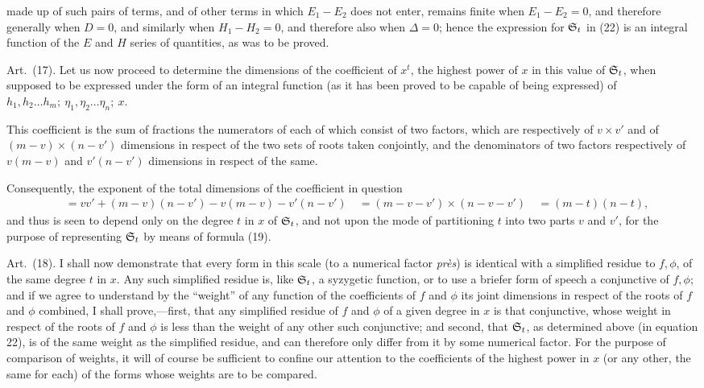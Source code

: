 \documentclass[11pt]{article}
\newcommand{\sourcepage}[1]{\marginpar{\scriptsize p.~#1}}
\newcommand{\art}[1]{\par\smallskip\noindent Art.~(#1).\quad}
\begin{document}
\sourcepage{463}
made up of such pairs of terms, and of other terms in which $E_1-E_2$ does not enter, remains finite when $E_1-E_2=0$, and therefore generally when $D=0$, and similarly when $H_1-H_2=0$, and therefore also when $\Delta=0$; hence the expression for $\mathfrak{S}_t$ in (22) is an integral function of the $E$ and $H$ series of quantities, as was to be proved.

\art{17} Let us now proceed to determine the dimensions of the coefficient of $x^t$, the highest power of $x$ in this value of $\mathfrak{S}_t$, when supposed to be expressed under the form of an integral function (as it has been proved to be capable of being expressed) of $h_1,h_2\ldots h_m;\ \eta_1,\eta_2\ldots\eta_n;\ x$.

This coefficient is the sum of fractions the numerators of each of which consist of two factors, which are respectively of $v\times v'$ and of $(m-v)\times(n-v')$ dimensions in respect of the two sets of roots taken conjointly, and the denominators of two factors respectively of $v(m-v)$ and $v'(n-v')$ dimensions in respect of the same.

Consequently, the exponent of the total dimensions of the coefficient in question
\[
\begin{aligned}
&=vv'+(m-v)(n-v')-v(m-v)-v'(n-v')\
&=(m-v-v')\times(n-v-v')\
&=(m-t)(n-t),
\end{aligned}
\]
and thus is seen to depend only on the degree $t$ in $x$ of $\mathfrak{S}_t$, and not upon the mode of partitioning $t$ into two parts $v$ and $v'$, for the purpose of representing $\mathfrak{S}_t$ by means of formula (19).

\art{18} I shall now demonstrate that every form in this scale (to a numerical factor \emph{près}) is identical with a simplified residue to $f,\phi$, of the same degree $t$ in $x$. Any such simplified residue is, like $\mathfrak{S}_t$, a syzygetic function, or to use a briefer form of speech a conjunctive of $f,\phi$; and if we agree to understand by the ``weight'' of any function of the coefficients of $f$ and $\phi$ its joint dimensions in respect of the roots of $f$ and $\phi$ combined, I shall prove,---first, that any simplified residue of $f$ and $\phi$ of a given degree in $x$ is that conjunctive, whose weight in respect of the roots of $f$ and $\phi$ is less than the weight of any other such conjunctive; and second, that $\mathfrak{S}_t$, as determined above (in equation 22), is of the same weight as the simplified residue, and can therefore only differ from it by some numerical factor. For the purpose of comparison of weights, it will of course be sufficient to confine our attention to the coefficients of the highest power in $x$ (or any other, the same for each) of the forms whose weights are to be compared.
\end{document}
